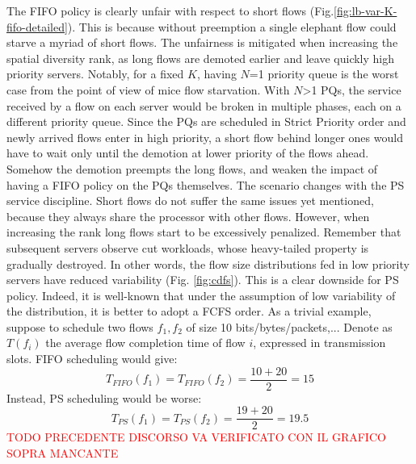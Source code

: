 The FIFO policy is clearly unfair with respect to short flows (Fig.\ref{fig:lb-var-K-fifo-detailed}). This is because without preemption a single elephant flow could starve a myriad of short flows. The unfairness is mitigated when increasing the spatial diversity rank, as long flows are demoted earlier and leave quickly high priority servers. Notably, for a fixed $K$, having $N$=1 priority queue is the worst case from the point of view of mice flow starvation. With $N$>1 PQs, the service received by a flow on each server would be broken in multiple phases, each on a different priority queue. Since the PQs are scheduled in Strict Priority order and newly arrived flows enter in high priority, a short flow behind longer ones would have to wait only until the demotion at lower priority of the flows ahead. Somehow the demotion preempts the long flows, and weaken the impact of having a FIFO policy on the PQs themselves. The scenario changes with the PS service discipline. Short flows do not suffer the same issues yet mentioned, because they always share the processor with other flows. However, when increasing the rank long flows start to be excessively penalized. Remember that subsequent servers observe cut workloads, whose heavy-tailed property is gradually destroyed. In other words, the flow size distributions fed in low priority servers have reduced variability (Fig. \ref{fig:cdfs}). This is a clear downside for PS policy. Indeed, it is well-known that under the assumption of low variability of the distribution, it is better to adopt a FCFS order. As a trivial example, suppose to schedule two flows $f_1, f_2$ of size 10 bits/bytes/packets,... Denote as $T(f_i)$ the average flow completion time of flow $i$, expressed in transmission slots. FIFO scheduling would give:
\[
	T_{FIFO}(f_1) = T_{FIFO}(f_2) = \dfrac{10+20}{2} = 15
\]
Instead, PS scheduling would be worse:
\[
T_{PS}(f_1) = T_{PS}(f_2) = \dfrac{19+20}{2} = 19.5
\]
\textcolor{red}{TODO PRECEDENTE DISCORSO VA VERIFICATO CON IL GRAFICO SOPRA MANCANTE}\\
